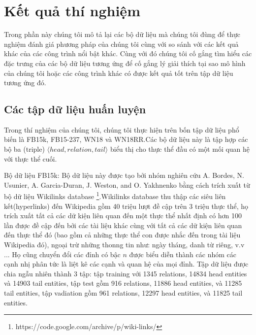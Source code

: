 


\section{Kết quả thí nghiệm}
Trong phần này chúng tôi mô tả lại các bộ dữ liệu mà chúng tôi đùng để thực nghiệm đánh giá phương pháp của chúng tôi cùng với so sánh với các kết quả khác của các công trình nổi bật khác. Cùng với đó chúng tôi cố gắng tìm hiểu các đặc trưng của các bộ dữ liệu tương ứng để cố gắng lý giải thích tại sao mô hình của chúng tôi hoặc các công trình khác có được kết quả tốt trên tập dữ liệu tương ứng đó.
\subsection{Các tập dữ liệu huấn luyện} \label{datasets}
Trong thí nghiệm của chúng tôi, chúng tôi thực hiện trên bốn tập dữ liệu phổ biến là FB15k, FB15-237, WN18 và WN18RR.Các bộ dữ liệu này là tập hợp các bộ ba (triple) \(\langle head, relation, tail \rangle\) biểu thị cho thực thể đầu có một mối quan hệ với thực thể cuối.

Bộ dữ liệu FB15k: Bộ dữ liệu này được tạo bởi nhóm nghiên cứu A. Bordes, N. Usunier, A. Garcia-Duran, J. Weston, and O. Yakhnenko \cite{bordes2013translating} bằng cách trích xuất từ bộ dữ liệu Wikilinks database \footnote{https://code.google.com/archive/p/wiki-links/}.Wikilinks database thu thập các siêu liên kết(hyperlinks) đến Wikipedia gồm 40 triệu lượt đề cập trên 3 triệu thực thể, họ trích xuất tất cả các dữ kiện liên quan đến một thực thể nhất định có hơn 100 lần được đề cập đến bởi các tài liệu khác cùng với tất cả các dữ kiện liên quan đến thực thể đó (bao gồm cả những thực thể con được nhắc đến trong tài liệu Wikipedia đó), ngoại trừ những thonng tin như: ngày tháng, danh từ riêng, v.v ... Họ cũng chuyển đổi các đỉnh có bậc \(n\) được biểu diễn thành các nhóm các cạnh nhị phân tức là liệt kê các cạnh và quan hệ của mọi đỉnh. Tập dữ liệu được chia ngẫu nhiên thành 3 tập: tập training với 1345 relations, 14834 head entities và 14903 tail entities, tập test gồm 916 relations, 11886 head entities, và 11285 tail entities, tập vadiation gồm 961 relations, 12297 head entities, và 11825 tail entities.

